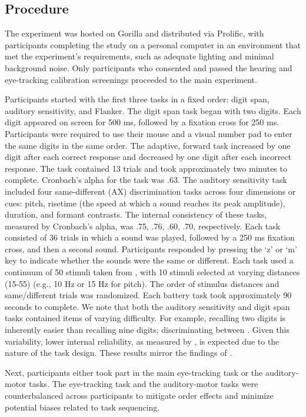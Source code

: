 \subsection{Procedure}

The experiment was hosted on Gorilla \citep{Anwyl-Irvine_2019} and distributed via Prolific, with participants completing the study on a personal computer in an environment that met the experiment’s requirements, such as adequate lighting and minimal background noise. Only participants who consented and passed the hearing and eye-tracking calibration screenings proceeded to the main experiment.

Participants started with the first three tasks in a fixed order: digit span, auditory sensitivity, and Flanker. The digit span task began with two digits. Each digit appeared on screen for 500 ms, followed by a fixation cross for 250 ms. Participants were required to use their mouse and a visual number pad to enter the same digits in the same order. The adaptive, forward task increased by one digit after each correct response and decreased by one digit after each incorrect response. The task contained 13 trials and took approximately two minutes to complete. Cronbach's alpha for the task was .63. The auditory sensitivity task included four same-different (AX) discrimination tasks across four dimensions or cues:  pitch, risetime (the speed at which a sound reaches its peak amplitude), duration, and formant contrasts. The internal consistency of these tasks, measured by Cronbach’s alpha, was .75, .76, .60, .70, respectively. Each task consisted of 36 trials in which a sound was played, followed by a 250 ms fixation cross, and then a second sound. Participants responded by pressing the ‘z’ or ‘m’ key to indicate whether the sounds were the same or different. Each task used a continuum of 50 stimuli taken from \citep{Kachlicka_Saito_Tierney_2019}, with 10 stimuli selected at varying distances (15-55) (e.g., 10 Hz or 15 Hz for pitch). The order of stimulus distances and same/different trials was randomized. Each battery task took approximately 90 seconds to complete. We note that both the auditory sensitivity and digit span tasks contained items of varying difficulty. For example, recalling two digits is inherently easier than recalling nine digits; discriminating between . Given this variability, lower internal reliability, as measured by \cite{Cronbach1951}, is expected due to the nature of the task design. These results mirror the findings of \cite{ppcc}.

Next, participants either took part in the main eye-tracking task or the auditory-motor tasks. The eye-tracking task and the auditory-motor tasks were counterbalanced across participants to mitigate order effects and minimize potential biases related to task sequencing.


